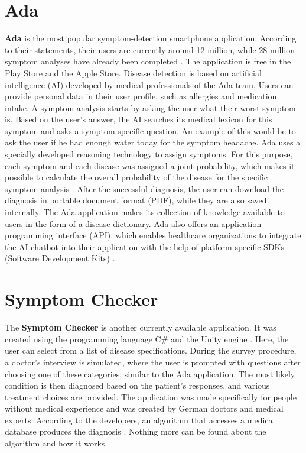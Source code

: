 \section{Ada} 
\textbf{Ada} is the most popular symptom-detection smartphone application. According to their statements, their users are currently around 12 million, while 28 million symptom analyses have already been completed \cite{.adaHOME}. The application is free in the Play Store and the Apple Store. Disease detection is based on artificial intelligence (AI) developed by medical professionals of the Ada team. Users can provide personal data in their user profile, such as allergies and medication intake. A symptom analysis starts by asking the user what their worst symptom is. Based on the user's answer, the AI searches its medical lexicon for this symptom and asks a symptom-specific question.
An example of this would be to ask the user if he had enough water today for the symptom headache. Ada uses a specially developed reasoning technology to assign symptoms. For this purpose, each symptom and each disease was assigned a joint probability, which makes it possible to calculate the overall probability of the disease for the specific symptom analysis \cite{.adaKI}. After the successful diagnosis, the user can download the diagnosis in portable document format (PDF), while they are also saved internally. The Ada application makes its collection of knowledge available to users in the form of a disease dictionary. Ada also offers an application programming interface (API), which enables healthcare organizations to integrate the AI chatbot into their application with the help of platform-specific SDKs (Software Development Kits)\cite{.adaFAQ} \cite{.adaDOCU}.

\section{Symptom Checker} 
The \textbf{Symptom Checker} is another currently available application. It was created using the programming language C\# and the Unity engine \cite{.symptomchecker}. Here, the user can select from a list of disease specifications. During the survey procedure, a doctor's interview is simulated, where the user is prompted with questions after choosing one of these categories, similar to the Ada application. The most likely condition is then diagnosed based on the patient's responses, and various treatment choices are provided. The application was made specifically for people without medical experience and was created by German doctors and medical experts. According to the developers, an algorithm that accesses a medical database produces the diagnosis \cite{.symptomchecker}. Nothing more can be found about the algorithm and how it works. 

